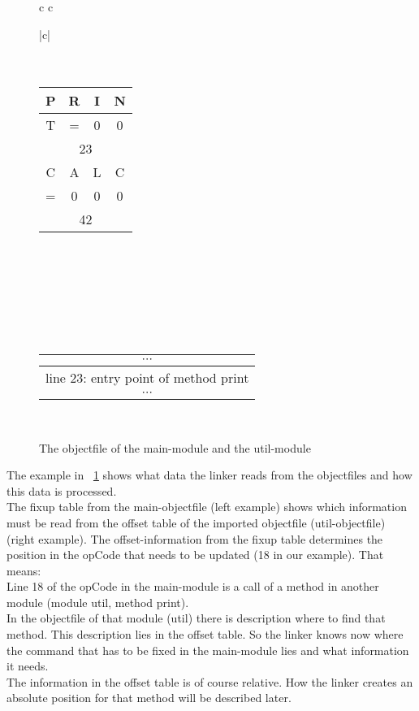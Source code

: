 \begin{figure}[h]
\begin{tabular}{c c}
		\begin{tabular}{|c|}
			\hline
			0 \\
			 \\
			\hline
			6 \\
			\hline
			\begin{tabular}{|c|c|c|c|}
				P & R & I & N \\
				\hline
				T &  = &  0 & 0 \\
				\hline 
				\multicolumn{4}{|c|}{23} \\
				\hline
				C & A & L & C \\
				\hline
				= &  0 &  0 & 0 \\
				\hline 
				\multicolumn{4}{|c|}{42} \\
			\end{tabular}
			\\ 
			 \\
			\hline
			\\ \\ \\ \\
			\hline
			\begin{tabular}{c}
				$ \cdots $ \\
				\hline
				line 23: entry point of method print \\
				\hline
				$ \cdots $ \\
			\end{tabular}
			\\
			\hline 
		\end{tabular}

\end{tabular}
\caption{The objectfile of the main-module and the util-module}
\label{linker:example:linker}
\end{figure}

The example in ~\ref{linker:example:linker} shows what data the linker reads from the
objectfiles and how this data is processed. \\
The fixup table from the main-objectfile (left example) shows which information
must be read from the offset table of the imported objectfile (util-objectfile)
(right example). The offset-information from the fixup table determines the
position in the opCode that needs to be updated (18 in our example). 
That means: \\
Line 18 of the opCode in the main-module is a call of a method in another module
(module util, method print). 
\\
In the objectfile of that module (util) there is description where to find that
method. This description lies in the offset table. So the linker knows now where
the command that has to be fixed in the main-module lies and what information it
needs.  
\\
The information in the offset table is of course relative. How the linker
creates an absolute position for that method will be described later. 

